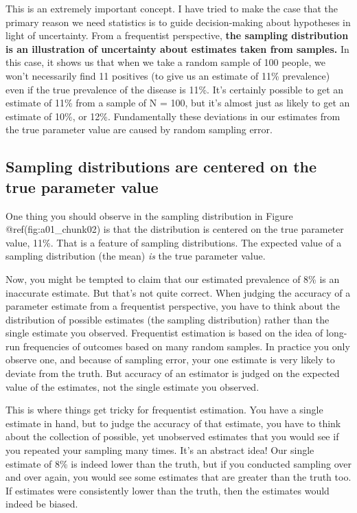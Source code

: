 \documentclass[
]{book}
\begin{document}
This is an extremely important concept. I have tried to make the case that the primary reason we need statistics is to guide decision-making about hypotheses in light of uncertainty. From a frequentist perspective, \textbf{the sampling distribution is an illustration of uncertainty about estimates taken from samples.} In this case, it shows us that when we take a random sample of 100 people, we won't necessarily find 11 positives (to give us an estimate of 11\% prevalence) even if the true prevalence of the disease is 11\%. It's certainly possible to get an estimate of 11\% from a sample of N = 100, but it's almost just as likely to get an estimate of 10\%, or 12\%. Fundamentally these deviations in our estimates from the true parameter value are caused by random sampling error.

\subsection{Sampling distributions are centered on the true parameter value}\label{sampling-distributions-are-centered-on-the-true-parameter-value}

One thing you should observe in the sampling distribution in Figure @ref(fig:a01\_chunk02) is that the distribution is centered on the true parameter value, 11\%. That is a feature of sampling distributions. The expected value of a sampling distribution (the mean) \emph{is} the true parameter value.

Now, you might be tempted to claim that our estimated prevalence of 8\% is an inaccurate estimate. But that's not quite correct. When judging the accuracy of a parameter estimate from a frequentist perspective, you have to think about the distribution of possible estimates (the sampling distribution) rather than the single estimate you observed. Frequentist estimation is based on the idea of long-run frequencies of outcomes based on many random samples. In practice you only observe one, and because of sampling error, your one estimate is very likely to deviate from the truth. But accuracy of an estimator is judged on the expected value of the estimates, not the single estimate you observed.

This is where things get tricky for frequentist estimation. You have a single estimate in hand, but to judge the accuracy of that estimate, you have to think about the collection of possible, yet unobserved estimates that you would see if you repeated your sampling many times. It's an abstract idea! Our single estimate of 8\% is indeed lower than the truth, but if you conducted sampling over and over again, you would see some estimates that are greater than the truth too. If estimates were consistently lower than the truth, then the estimates would indeed be biased.
\end{document}
